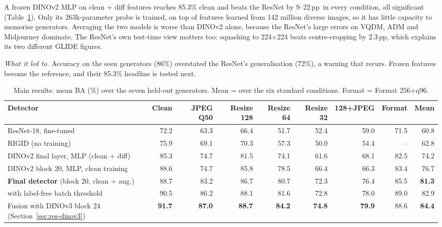 \documentclass[10pt,a4paper]{article}
\newcommand{\best}[1]{\textbf{#1}}
\newcommand{\pp}{\,pp}
\newcommand{\ledto}[1]{\par\noindent\textit{\color{ntublue}What it led to.} #1\par}
\begin{document}
A frozen DINOv2 MLP on clean + diff features reaches 85.3\% clean and beats the ResNet by 9--22\pp\ in every condition, all significant (Table~\ref{tab:main}). Only its 263k-parameter probe is trained, on top of features learned from 142 million diverse images, so it has little capacity to memorise generators. Averaging the two models is worse than DINOv2 alone, because the ResNet's large errors on VQDM, ADM and Midjourney dominate. The ResNet's own test-time view matters too: squashing to 224$\times$224 beats centre-cropping by 2.3\pp, which explains its two different GLIDE figures.
\ledto{Accuracy on the seen generators (86\%) overstated the ResNet's generalisation (72\%), a warning that recurs. Frozen features become the reference, and their 85.3\% headline is tested next.}

\begin{table}[h]
\centering\footnotesize
\caption{Main results: mean BA (\%) over the seven held-out generators. Mean = over the six standard conditions. Format = Format 256+q96.}\label{tab:main}
\setlength{\tabcolsep}{4.2pt}
\begin{tabular}{@{}lrrrrrrrr@{}}
\toprule
Detector & Clean & JPEG Q50 & Resize 128 & Resize 64 & Resize 32 & 128+JPEG & Format & Mean \\
\midrule
ResNet-18, fine-tuned & 72.2 & 63.3 & 66.4 & 51.7 & 52.4 & 59.0 & 71.5 & 60.8 \\
RIGID (no training) & 75.9 & 69.1 & 70.3 & 57.3 & 50.0 & 54.4 & -- & 62.8 \\
DINOv2 final layer, MLP (clean + diff) & 85.3 & 74.7 & 81.5 & 74.1 & 61.6 & 68.1 & 82.5 & 74.2 \\
DINOv2 block 20, MLP, clean training & 88.6 & 74.7 & 85.8 & 78.5 & 66.4 & 66.3 & 83.4 & 76.7 \\
\textbf{Final detector} (block 20, clean + aug.) & 88.7 & 83.2 & 86.7 & 80.7 & 72.3 & 76.4 & 85.5 & \textbf{81.3} \\
\quad with label-free batch threshold & 90.5 & 86.2 & 88.1 & 81.6 & 72.8 & 78.0 & 89.0 & 82.9 \\
Fusion with DINOv3 block 24 (Section~\ref{sec:res-dinov3}) & \best{91.7} & \best{87.0} & \best{88.7} & \best{84.2} & \best{74.8} & \best{79.9} & 88.6 & \best{84.4} \\
\bottomrule
\end{tabular}
\end{table}
\end{document}
